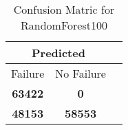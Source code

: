 \begin{table}[] 
\caption{Confusion Matric for RandomForest100} 
\label{Table: Prediction Accuracy-NoneRandomForest100SVMEKF-ignoresolarPanelDipole-solarPanelDipole} 
\centering 
\begin{tabular} 
 {@{}ccc@{}} 
\toprule 
\multicolumn{2}{c}{\textbf{Predicted}}
 \\ \midrule 
\multicolumn{1}{|c|}{Failure} & 
\multicolumn{1}{c|}{No Failure}
 \\ \midrule 
\multicolumn{1}{|c|}{\color{green}\textbf{63422}} & 
\multicolumn{1}{c|}{\color{red}\textbf{0}}
 \\ \midrule 
\multicolumn{1}{|c|}{\color{red}\textbf{48153}} & 
\multicolumn{1}{c|}{\color{green}\textbf{58553}}
 \\ \bottomrule 
\end{tabular} 
\end{table} 
